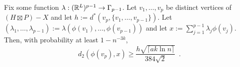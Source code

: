 \documentclass{patmorin}
\renewcommand{\ge}{\geqslant}
\begin{document}
\begin{lem}\label{crux}
  Fix some function $\lambda:(\mathbb{R}^{L})^{p-1}\to \Gamma_{p-1}$.
  Let $v_1,\ldots,v_p$ be distinct vertices of $(H\boxtimes P)-X$ and let $h:=d^*(v_p,\{v_1,\ldots,v_{p-1}\})$.  Let $(\lambda_1,\ldots,\lambda_{p-1}):=\lambda(\phi(v_1),\ldots,\phi(v_{p-1}))$ and let $x:=\sum_{j=1}^{p-1}\lambda_j\phi(v_j)$.
  Then, with probability at least $1-n^{-3k}$,
  \[
    d_2(\phi(v_p),x)\ge \frac{h\sqrt{\lceil ak\ln n\rceil}}{384\sqrt{2}} \enspace .
  \]
\end{lem}
\end{document}
